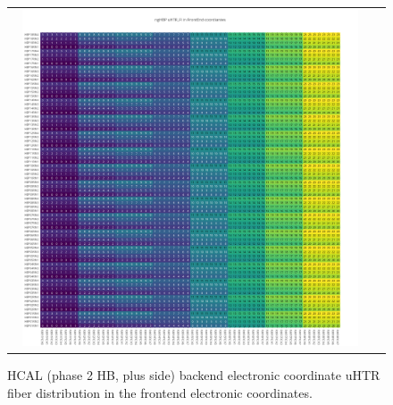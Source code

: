 \begin{figure}[htb]
 \begin{center}
  \begin{tabular}{cc}
   \includegraphics[angle=0,width=0.95\textwidth]{figures/appendix/ngHBP_uHTR_FI_in_FrontEnd.png}
  \end{tabular}
  \caption{HCAL (phase 2 HB, plus side) backend electronic coordinate uHTR fiber distribution in the frontend electronic coordinates.}
  \label{fig:lmapngHBPuHTRFIFEC}
 \end{center}
\end{figure}
\clearpage

